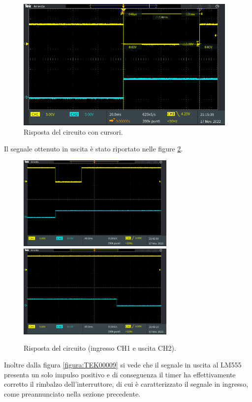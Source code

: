 \documentclass{report}
\begin{document}
\begin{figure}[h!]
	\centering
	\includegraphics[height=6.5cm]{immagini/TEK00010}
	\caption{Risposta del circuito con cursori.}
	\label{figura:TEK00010}
\end{figure}

\noindent Il segnale ottenuto in uscita è stato riportato nelle figure \ref{figura:TEK00016e17}.

\begin{figure}[h!]
	\centering
	\includegraphics[height=4.6cm]{immagini/TEK00016}
	\includegraphics[height=4.6cm]{immagini/TEK00017}
	\caption{Risposta del circuito (ingresso CH1 e uscita CH2).}
	\label{figura:TEK00016e17}
\end{figure}

\noindent Inoltre dalla figura \ref{figura:TEK00009} si vede che il segnale in uscita al LM555 presenta un solo impulso positivo e di conseguenza il timer ha effettivamente corretto il rimbalzo dell'interruttore, di cui è caratterizzato il segnale in ingresso, come preannunciato nella sezione precedente.
\end{document}
